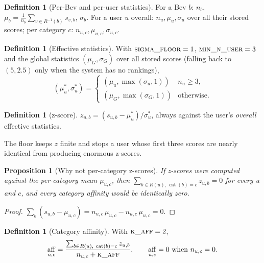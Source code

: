 \documentclass[11pt]{article}
\DeclareMathOperator{\aff}{aff}
\DeclareMathOperator{\cat}{cat}
\theoremstyle{plain}
\newtheorem{proposition}[theorem]{Proposition}
\theoremstyle{definition}
\newtheorem{definition}[theorem]{Definition}
\theoremstyle{remark}
\begin{document}
\begin{definition}[Per-Bev and per-user statistics]
For a Bev $b$: $n_b$, $\mu_b = \frac{1}{n_b}\sum_{v \in R^{-1}(b)} s_{v,b}$, $\sigma_b$. For a user $u$ overall: $n_u, \mu_u, \sigma_u$ over all their stored scores; per category $c$: $n_{u,c}, \mu_{u,c}, \sigma_{u,c}$.
\end{definition}

\begin{definition}[Effective statistics]\label{def:effective}
With $\textsc{sigma\_floor} = 1$, $\textsc{min\_n\_user} = 3$ and the global statistics $(\mu_G, \sigma_G)$ over all stored scores (falling back to $(5, 2.5)$ only when the system has no rankings),
\[
(\mu^\ast_u, \sigma^\ast_u) =
\begin{cases}
(\mu_u, \max(\sigma_u, 1)) & n_u \ge 3, \\
(\mu_G, \max(\sigma_G, 1)) & \text{otherwise.}
\end{cases}
\]
\end{definition}

\begin{definition}[z-score]
$z_{u,b} = (s_{u,b} - \mu^\ast_u) / \sigma^\ast_u$, always against the user's \emph{overall} effective statistics.
\end{definition}

The floor keeps $z$ finite and stops a user whose first three scores are nearly identical from producing enormous z-scores.

\begin{proposition}[Why not per-category z-scores]\label{prop:percat}
If z-scores were computed against the per-category mean $\mu_{u,c}$, then $\sum_{b \in R(u),\, \cat(b) = c} z_{u,b} = 0$ for every $u$ and $c$, and every category affinity would be identically zero.
\end{proposition}
\begin{proof}
$\sum_{b} (s_{u,b} - \mu_{u,c}) = n_{u,c}\,\mu_{u,c} - n_{u,c}\,\mu_{u,c} = 0$.
\end{proof}

\begin{definition}[Category affinity]\label{def:affinity}
With $\textsc{k\_aff} = 2$,
\begin{equation}\label{eq:aff}
\aff_{u,c} = \frac{\sum_{b \in R(u),\ \cat(b) = c} z_{u,b}}{n_{u,c} + \textsc{k\_aff}}, \qquad \aff_{u,c} = 0 \text{ when } n_{u,c} = 0 .
\end{equation}
\end{definition}
\end{document}
